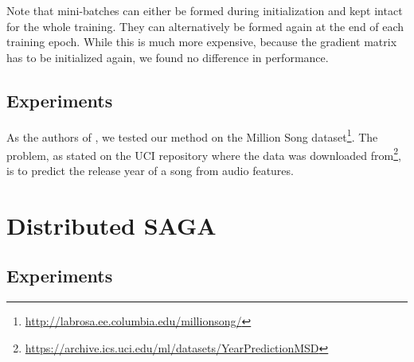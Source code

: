 \documentclass[a4paper,11pt]{article}
\begin{document}
Note that mini-batches can either be formed during initialization and kept
intact for the whole training. They can alternatively be formed again at the end
of each training epoch. While this is much more expensive, because the gradient
matrix has to be initialized again, we found no difference in performance.

\subsection{Experiments}

As the authors of \cite{defazio_saga_2014}, we tested our method on the Million
Song dataset\footnote{\url{http://labrosa.ee.columbia.edu/millionsong/}}. The
problem, as stated on the UCI repository where the data was downloaded
from\footnote{\url{https://archive.ics.uci.edu/ml/datasets/YearPredictionMSD}},
is to predict the release year of a song from audio features.

\section{Distributed SAGA}

\subsection{Experiments}

\printbibliography
\end{document}
